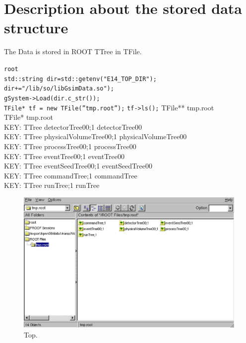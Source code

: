 \documentclass[a4paper,12pt]{article}
\begin{document}
  
  
  
  
 \section{Description about the stored data structure}
 The Data is stored in ROOT TTree in TFile.
 \begin{screen}
  {\tt root\return\\}
  {\tt std::string dir=std::getenv("E14\_TOP\_DIR");}\\
  {\tt dir+="/lib/so/libGsimData.so");}\\
  {\tt gSystem->Load(dir.c\_str());}\\
  {\tt TFile* tf = new TFile(''tmp.root'');}
  {\tt tf->ls();}
{\small
TFile**         tmp.root        \\
 TFile*         tmp.root        \\
  KEY: TTree    detectorTree00;1        detectorTree00\\
  KEY: TTree    physicalVolumeTree00;1  physicalVolumeTree00\\
  KEY: TTree    processTree00;1 processTree00\\
  KEY: TTree    eventTree00;1   eventTree00\\
  KEY: TTree    eventSeedTree00;1       eventSeedTree00\\
  KEY: TTree    commandTree;1   commandTree\\
  KEY: TTree    runTree;1       runTree\\
  }
 \end{screen}

 \begin{figure}[H]
  \begin{center}
   \includegraphics[scale=0.5]{xwd/top.eps}
  \end{center}
  \caption{Top.}
 \end{figure}
 
\end{document}
